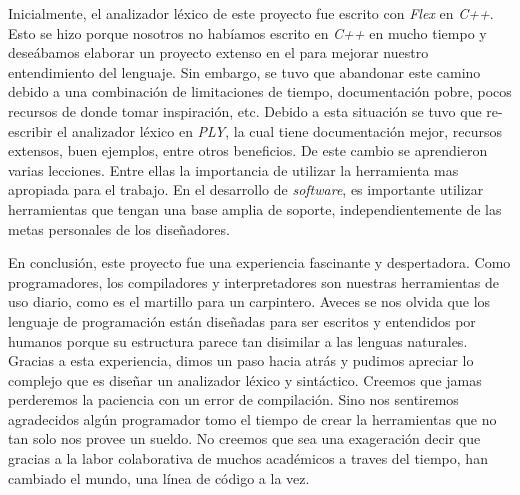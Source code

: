 Inicialmente, el analizador léxico de este proyecto fue escrito con \textit{Flex} \cite{noauthor_flex_nodate} en \textit{C++}. 
Esto se hizo porque nosotros no habíamos escrito en \textit{C++} en mucho tiempo y deseábamos elaborar un proyecto extenso en el para mejorar nuestro entendimiento del lenguaje. 
Sin embargo, se tuvo que abandonar este camino debido a una combinación de limitaciones de tiempo, documentación pobre, pocos recursos de donde tomar inspiración, etc. 
Debido a esta situación se tuvo que re-escribir el analizador léxico en \textit{PLY}, la cual tiene documentación mejor, recursos extensos, buen ejemplos, entre otros beneficios. 
De este cambio se aprendieron varias lecciones. 
Entre ellas la importancia de utilizar la herramienta mas apropiada para el trabajo. 
En el desarrollo de \textit{software}, es importante utilizar herramientas que tengan una base amplia de soporte, independientemente de las metas personales de los diseñadores. 

En conclusión, este proyecto fue una experiencia fascinante y despertadora.
Como programadores, los compiladores y interpretadores son nuestras herramientas de uso diario, como es el martillo para un carpintero.
Aveces se nos olvida que los lenguaje de programación están diseñadas para ser escritos y entendidos por humanos porque su estructura parece tan disimilar a las lenguas naturales. 
Gracias a esta experiencia, dimos un paso hacia atrás y pudimos apreciar lo complejo que es diseñar un analizador léxico y sintáctico.
Creemos que jamas perderemos la paciencia con un error de compilación.
Sino nos sentiremos agradecidos algún programador tomo el tiempo de crear la herramientas que no tan solo nos provee un sueldo. 
No creemos que sea una exageración decir que gracias a la labor colaborativa de muchos académicos a traves del tiempo, han cambiado el mundo, una línea de código a la vez.